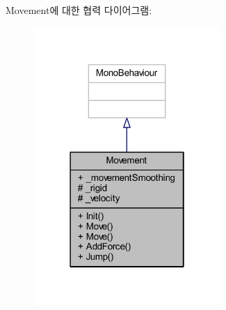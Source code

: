 Movement에 대한 협력 다이어그램\+:\nopagebreak
\begin{figure}[H]
\begin{center}
\leavevmode
\includegraphics[width=202pt]{d6/dad/class_movement__coll__graph}
\end{center}
\end{figure}
